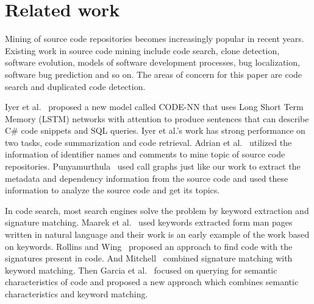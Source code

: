\section{Related work}


Mining of source code repositories becomes increasingly popular in
recent years. Existing work in source code mining include
code search, clone detection, software evolution,
models of software development processes, bug localization,
software bug prediction and so on. The areas of concern for this
paper are code search and duplicated code detection.

Iyer et al.~ proposed a new model called CODE-NN
that uses Long Short Term Memory (LSTM) networks with attention
to produce sentences that can describe C\# code snippets and SQL queries.
Iyer et al.'s work has strong performance on two tasks,
code summarization and code retrieval.
Adrian et al.~\cite{kuhn2007semantic} utilized the information of
identifier names and comments to mine topic of source code repositories.
Punyamurthula~ used call graphs just like
our work to extract the metadata and dependency information from the
source code and used these information to analyze the source code
and get its topics.

In code search, most search engines solve the problem by keyword extraction
and signature matching. Maarek et al.~\cite{maarek1991information} used keywords extracted form man pages written in natural language and their work is an early example of the work based on keywords. Rollins and Wing~ proposed an approach to find code with the signatures present in code. And Mitchell~ combined signature matching with keyword matching. Then Garcia et al.~\cite{garcia2016semantic} focused on querying for semantic characteristics of code and proposed a new approach which combines semantic characteristics and keyword matching.

